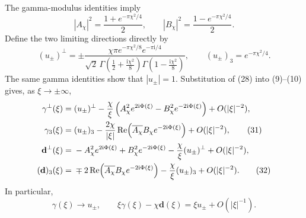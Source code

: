 \documentclass[11pt]{article}
\newcommand{\ii}{\mathrm i}
\newcommand{\Rea}{\operatorname{Re}}
\begin{document}
The gamma-modulus identities imply
\begin{equation}
 |A_\chi|^2=\frac{1+e^{-\pi\chi^2/4}}2,
 \qquad
 |B_\chi|^2=\frac{1-e^{-\pi\chi^2/4}}2. \tag{29}
\end{equation}
Define the two limiting directions directly by
\begin{equation}
 (u_\pm)^\perp=
 \pm\frac{\chi\pi e^{-\pi\chi^2/8}e^{-\pi\ii/4}}
 {\sqrt2\,\Gamma(\frac12+\frac{\ii\chi^2}{8})
 \Gamma(1-\frac{\ii\chi^2}{8})},
 \qquad
 (u_\pm)_3=e^{-\pi\chi^2/4}. \tag{30}
\end{equation}
The same gamma identities show that \(|u_\pm|=1\). Substitution of (28) into (9)--(10) gives, as \(\xi\to\pm\infty\),
\begin{align}
 \gamma^\perp(\xi)={}&(u_\pm)^\perp
 -\frac{\chi}{\xi}\left(
 A_\chi^2e^{2\ii\Phi(\xi)}
 -B_\chi^2e^{-2\ii\Phi(\xi)}\right)
 +O(|\xi|^{-2}), \notag\\
 \gamma_3(\xi)={}&(u_\pm)_3
 -\frac{2\chi}{|\xi|}\Rea\!\left(
 \overline{A_\chi}B_\chi e^{-2\ii\Phi(\xi)}\right)
 +O(|\xi|^{-2}), \tag{31}\\
 \mathbf d^\perp(\xi)={}&-A_\chi^2e^{2\ii\Phi(\xi)}
 +B_\chi^2e^{-2\ii\Phi(\xi)}
 -\frac{\chi}{\xi}(u_\pm)^\perp+O(|\xi|^{-2}), \notag\\
 (\mathbf d)_3(\xi)={}&\mp2\Rea\!\left(
 \overline{A_\chi}B_\chi e^{-2\ii\Phi(\xi)}\right)
 -\frac{\chi}{\xi}(u_\pm)_3+O(|\xi|^{-2}). \tag{32}
\end{align}
In particular,
\begin{equation}
 \gamma(\xi)\longrightarrow u_\pm,
 \qquad
 \xi\gamma(\xi)-\chi\mathbf d(\xi)=\xi u_\pm+O(|\xi|^{-1}). \tag{33}
\end{equation}
\end{document}
